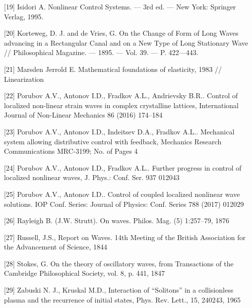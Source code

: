 [19]	Isidori A. Nonlinear Control Systems. — 3rd ed. — New York: Springer Verlag, 1995.

[20] Korteweg, D. J. and de Vries, G. On the Change of Form of Long Waves advancing in a Rectangular Canal and on a New Type of Long Stationary Wave // Philosophical Magazine. — 1895. — Vol. 39. — P. 422—443.

[21] Marsden Jerrold E. Mathematical foundations of elasticity, 1983 // Linearization

[22] Porubov A.V., Antonov I.D., Fradkov A.L., Andrievsky B.R.. Control of localized non-linear strain waves in complex crystalline lattices, International Journal of Non-Linear Mechanics 86 (2016) 174–184

[23] Porubov A.V., Antonov I.D., Indeitsev D.A., Fradkov A.L.. Mechanical system allowing distributive control with feedback, Mechanics Research Communications MRC-3199; No. of Pages 4

[24] Porubov A.V., Antonov I.D., Fradkov A.L.. Further progress in control of localized nonlinear waves, J. Phys.: Conf. Ser. 937 012043

[25] Porubov A.V., Antonov I.D.. Control of coupled localized nonlinear wave solutions. IOP Conf. Series: Journal of Physics: Conf. Series 788 (2017) 012029

[26] Rayleigh B. (J.W. Strutt). On waves. Philos. Mag. (5) 1:257–79, 1876

[27] Russell, J.S., Report on Waves. 14th Meeting of the British Association for the Advancement of Science, 1844

[28] Stokes, G. On the theory of oscillatory waves, from Transactions of the Cambridge Philosophical Society, vol. 8, p. 441, 1847

[29] Zabuski N. J., Kruskal M.D., Interaction of “Solitons” in a collisionless plasma and the recurrence of initial states, Phys. Rev. Lett., 15, 240243, 1965
